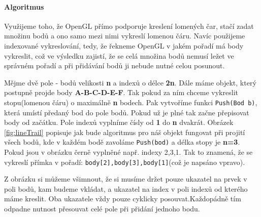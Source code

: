 \paragraph{Algoritmus}Využijeme toho, že OpenGL přímo podporuje kreslení lomených čar, stačí zadat množinu bodů a ono samo mezi nimi vykreslí lomenou čáru. Navíc použijeme indexované vykreslování, tedy, že řekneme OpenGL v jakém pořadí má body vykreslit, což ve výsledku zajistí, že se celá množina bodů nemusí ležet ve správném pořadí a při přidávání bodů ji nebude nutné celou posunout.

Mějme dvě pole - bodů velikosti \textbf{n} a indexů o délce \textbf{2n}.
Dále máme objekt, který postupně projde body \textbf{A-B-C-D-E-F}. Tak pokud za ním chceme vykreslit stopu(lomenou čáru) o maximálně \textbf{n} bodech. Pak vytvoříme funkci \texttt{Push(Bod b)}, která umístí předaný bod do pole bodů. Pokud už je plné tak začne přepisovat body od začátku. Pole indexů vyplníme čísly od \textbf{1} do \textbf{n} dvakrát. Obrázek \ref{fig:lineTrail} popisuje jak bude algoritmus pro náš objekt fungovat při projití všech bodů, kde v každém bodě zavoláme \texttt{Push(bod)} a délka stopy je \textbf{n=3}. Pokud jsou v obrázku černě vyplněné např. indexy 2,3,1. Tak to znamená, že se vykreslí přímka v pořadí: \lstinline|body[2],body[3],body[1]|(což je napsáno vpravo).

Z obrázku si můžeme všimnout, že si musíme držet pouze ukazatel na prvek v poli bodů, kam budeme vkládat, a ukazatel na index v poli indexů od kterého máme kreslit. Oba ukazatele vždy pouze cyklicky posouvat.Každopádně tím odpadne nutnost přesouvat celé pole při přidání jednoho bodu.
\\

